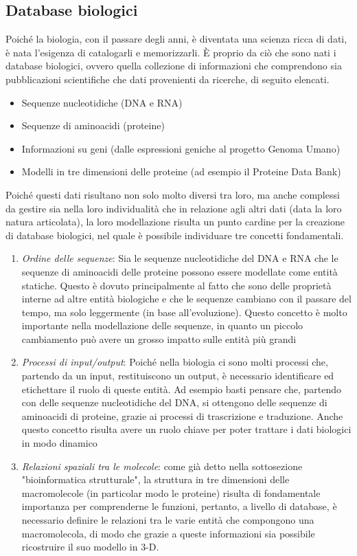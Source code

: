 \subsection{Database biologici}
Poiché la biologia, con il passare degli anni, è diventata una scienza ricca di dati, è nata l'esigenza di catalogarli e memorizzarli. \`E proprio da ciò che sono nati i database biologici, ovvero quella collezione di informazioni che comprendono sia pubblicazioni scientifiche che dati provenienti da ricerche, di seguito elencati.
\begin{itemize}
	\item Sequenze nucleotidiche (DNA e RNA)
	\item Sequenze di aminoacidi (proteine)
	\item Informazioni su geni (dalle espressioni geniche al progetto Genoma Umano)
	\item Modelli in tre dimensioni delle proteine (ad esempio il Proteine Data Bank\cite{proteineDataBank})
\end{itemize}
Poiché questi dati risultano non solo molto diversi tra loro, ma anche complessi da gestire sia nella loro individualità che in relazione agli altri dati (data la loro natura articolata), la loro modellazione risulta un punto cardine per la creazione di database biologici, nel quale è possibile individuare tre concetti fondamentali.
\begin{enumerate}
	\item \textit{Ordine delle sequenze}: Sia le sequenze nucleotidiche del DNA e RNA che le sequenze di aminoacidi delle proteine possono essere modellate come entità statiche. Questo è dovuto principalmente al fatto che sono delle proprietà interne ad altre entità biologiche e che le sequenze cambiano con il passare del tempo, ma solo leggermente (in base all'evoluzione).
	\newline
	Questo concetto è molto importante nella modellazione delle sequenze, in quanto un piccolo cambiamento può avere un grosso impatto sulle entità più grandi
	\item \textit{Processi di input/output}: Poiché nella biologia ci sono molti processi che, partendo da un input, restituiscono un output, è necessario identificare ed etichettare il ruolo di queste entità. Ad esempio basti pensare che, partendo con delle sequenze nucleotidiche del DNA, si ottengono delle sequenze di aminoacidi di proteine, grazie ai processi di trascrizione e traduzione.
	\newline
	Anche questo concetto risulta avere un ruolo chiave per poter trattare i dati biologici in modo dinamico
	\item \textit{Relazioni spaziali tra le molecole}: come già detto nella sottosezione "bioinformatica strutturale", la struttura in tre dimensioni delle macromolecole (in particolar modo le proteine) risulta di fondamentale importanza per comprenderne le funzioni, pertanto, a livello di database, è necessario definire le relazioni tra le varie entità che compongono una macromolecola, di modo che grazie a queste informazioni sia possibile ricostruire il suo modello in 3-D.
\end{enumerate}
